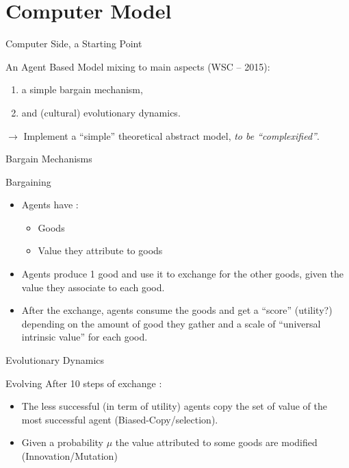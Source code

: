 \documentclass[8pt, handout=show,notes=show]{beamer}
\begin{document}
\section{Computer Model}
\begin{frame}{Computer Side, a Starting Point}

	An Agent Based Model mixing to main aspects (WSC -- 2015):

	\vfil
	\begin{enumerate}
		\item a	simple bargain mechanism,
		\item and (cultural) evolutionary dynamics.
	\end{enumerate}

	\vfill
	$\rightarrow$ Implement a ``simple'' theoretical abstract model, \emph{to be ``complexified''}.
\end{frame}



	
\begin{frame}{Bargain Mechanisms}
	\begin{block}{Bargaining}
		\begin{itemize}
			\item Agents have :
				\begin{itemize}
					\item Goods
					\item Value they attribute to goods
				\end{itemize}
			\item Agents produce 1 good and use it to exchange for the other goods, given the value they associate to each good.
			\item After the exchange, agents consume the goods and get a ``score'' (utility?) depending on the amount of good they gather and a scale of ``universal intrinsic value'' for each good.
		\end{itemize}

	\end{block}
\end{frame}

\begin{frame}{Evolutionary Dynamics}
	\begin{block}{Evolving}
		After 10 steps of exchange :
		\begin{itemize}
			\item  The less successful (in term of utility) agents copy the set of value of the most successful agent (Biased-Copy/selection).
			\item Given a probability $\mu$ the value attributed to some goods are modified (Innovation/Mutation)
		\end{itemize}

	\end{block}
\end{frame}
\end{document}
